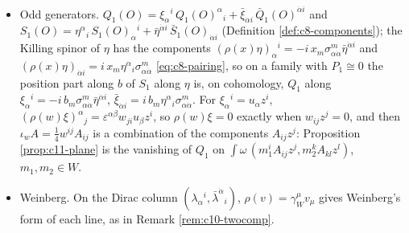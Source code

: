 \begin{remark}
\begin{itemize}
\item Odd generators. $Q_1(O)=\xi_\alpha{}^i\,Q_1(O)^\alpha{}_i+\bar\xi_{\dot\alpha i}\,\bar Q_1(O)^{\dot\alpha i}$ and $S_1(O)=\eta^\alpha{}_i\,S_1(O)_\alpha{}^i+\bar\eta^{\dot\alpha i}\,\bar S_1(O)_{\dot\alpha i}$ (Definition \ref{def:c8-components}); the Killing spinor of $\eta$ has the components $(\rho(x)\eta)_\alpha{}^i=-i\,x_m\sigma^m_{\alpha\dot\alpha}\bar\eta^{\dot\alpha i}$ and $(\rho(x)\eta)_{\dot\alpha i}=i\,x_m\eta^\alpha{}_i\sigma^m_{\alpha\dot\alpha}$ \eqref{eq:c8-pairing}, so on a family with $P_1\cong0$ the position part along $b$ of $S_1$ along $\eta$ is, on cohomology, $Q_1$ along $\xi_\alpha{}^i=-i\,b_m\sigma^m_{\alpha\dot\alpha}\bar\eta^{\dot\alpha i}$, $\bar\xi_{\dot\alpha i}=i\,b_m\eta^\alpha{}_i\sigma^m_{\alpha\dot\alpha}$. For $\xi_\alpha{}^i=u_\alpha z^i$, $(\rho(w)\xi)^\alpha{}_j=\varepsilon^{\alpha\beta}w_{ji}u_\beta z^i$, so $\rho(w)\xi=0$ exactly when $w_{ij}z^j=0$, and then $\iota_wA=\tfrac14w^{ij}A_{ij}$ is a combination of the components $A_{ij}z^j$: Proposition \ref{prop:c11-plane} is the vanishing of $Q_1$ on $\int\omega\,(m_1^iA_{ij}z^j,m_2^kA_{kl}z^l)$, $m_1,m_2\in W$.
\item Weinberg. On the Dirac column $(\lambda_\alpha{}^i,\bar\lambda^{\dot\alpha}{}_i)$, $\rho(v)=\gamma_W^\mu v_\mu$ gives Weinberg's form of each line, as in Remark \ref{rem:c10-twocomp}.
\end{itemize}
\end{remark}
